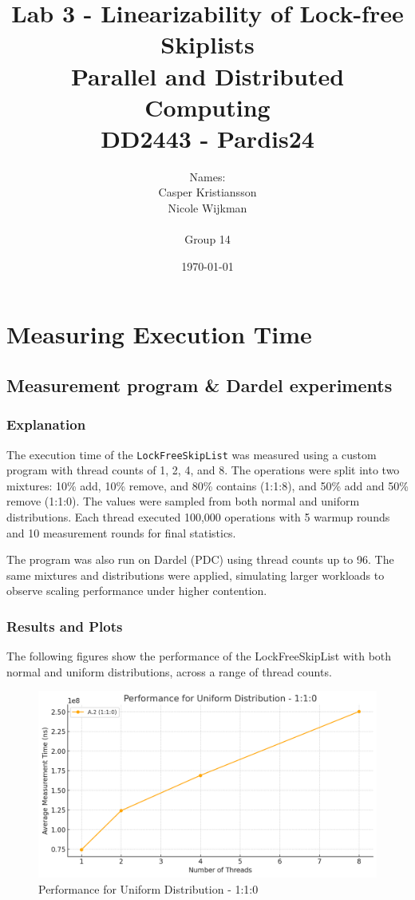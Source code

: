 \documentclass{article}
\title{\textbf{Lab 3 - Linearizability of Lock-free Skiplists\\Parallel and Distributed Computing\\DD2443 - Pardis24}}
\author{Names:\\Casper Kristiansson\\Nicole Wijkman\\\\Group 14}
\date{\today}
\begin{document}
\setlength\parindent{0pt}
\setlength{\parskip}{\bigskipamount}

\maketitle

\newpage
\section{Measuring Execution Time}

\subsection{Measurement program \& Dardel experiments}

\subsubsection{Explanation}
The execution time of the \texttt{LockFreeSkipList} was measured using a custom program with thread counts of 1, 2, 4, and 8. The operations were split into two mixtures: 10\% add, 10\% remove, and 80\% contains (1:1:8), and 50\% add and 50\% remove (1:1:0). The values were sampled from both normal and uniform distributions. Each thread executed 100,000 operations with 5 warmup rounds and 10 measurement rounds for final statistics.

The program was also run on Dardel (PDC) using thread counts up to 96. The same mixtures and distributions were applied, simulating larger workloads to observe scaling performance under higher contention.

\subsubsection{Results and Plots}

The following figures show the performance of the LockFreeSkipList with both normal and uniform distributions, across a range of thread counts.

\begin{figure}[H]
    \centering
    \includegraphics[width=\textwidth]{LaTex/images/Lab 3 1.2.1.png}
    \caption{Performance for Uniform Distribution - 1:1:0}
    \label{fig:enter-label}
\end{figure}
\end{document}
